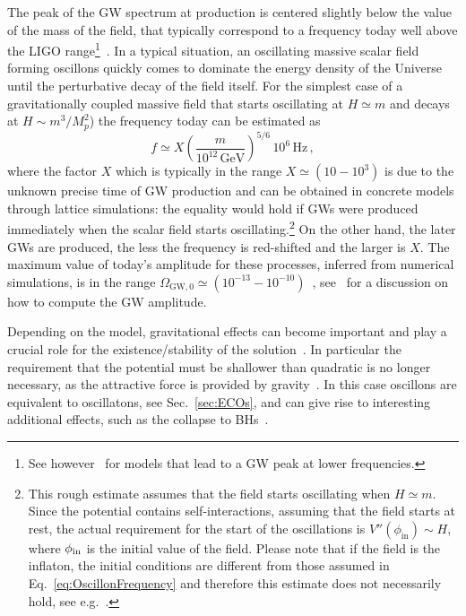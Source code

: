 \documentclass[11pt,a4paper]{article}
\begin{document}
The peak of the GW spectrum at production is centered slightly below the value of the mass of the field, that typically correspond to a frequency today well above the LIGO range\footnote{See however~\cite{Antusch:2016con, Liu:2017hua, Kitajima:2018zco} for models that lead to a GW peak at lower frequencies.}~\cite{Zhou:2013tsa, Antusch:2017flz, Lozanov:2019ylm}. In a typical situation, an oscillating massive scalar field forming oscillons quickly comes to dominate the energy density of the Universe until the perturbative decay of the field itself. For the simplest case of a gravitationally coupled massive field that starts oscillating at $H \simeq m$ and decays at $H \sim m^3/M_p^2$) the frequency today can be estimated as
\begin{equation}
\label{eq:OscillonFrequency}
f \simeq X \left(\frac{m}{10^{12} \, \text{GeV}}\right)^{5/6} \, 10^6 \, \text{Hz} \,,
\end{equation}
where the factor $X$ which is typically in the range $X \simeq (10-10^3)$ is due to the unknown precise time of GW production and can be obtained in concrete models through lattice simulations: the equality would hold if GWs were produced immediately when the scalar field starts oscillating.\footnote{This rough estimate assumes that the field starts oscillating when $H \simeq m$. Since the potential contains self-interactions, assuming that the field starts at rest, the actual requirement for the start of the oscillations is $V''(\phi_{\text{in}}) \sim H$, where $\phi_{\rm in}$ is the initial value of the field. Please note that if the field is the inflaton, the initial conditions are different from those assumed in Eq.~\eqref{eq:OscillonFrequency} and therefore this estimate does not necessarily hold, see e.g.~\cite{Antusch:2016con}.} On the other hand, the later GWs are produced, the less the frequency is red-shifted and the larger is $X$. The maximum value of today's amplitude for these processes, inferred from numerical simulations, is in the range $\Omega_{\text{GW},0} \simeq (10^{-13} - 10^{-10})$~\cite{Antusch:2016con, Antusch:2017flz, Amin:2018xfe}, see~\cite{Dufaux:2007pt} for a discussion on how to compute the GW amplitude.

Depending on the model, gravitational effects can become important and play a crucial role for the existence/stability of the solution~\cite{Seidel:1991zh}. In particular the requirement that the potential must be shallower than quadratic is no longer necessary, as the attractive force is provided by gravity~\cite{UrenaLopez:2002gx}. In this case oscillons are equivalent to oscillatons, see Sec.~\ref{sec:ECOs}, and can give rise to interesting additional effects, such as the collapse to BHs~\cite{Muia:2019coe, Giblin:2019nuv, Kou:2019bbc, Nazari:2020fmk}.
\end{document}
